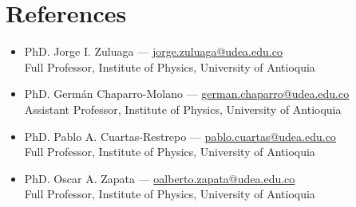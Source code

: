 \section*{References}
\begin{itemize}
    \item PhD. Jorge I. Zuluaga — \href{mailto:jorge.zuluaga@udea.edu.co}{\faEnvelope\hspace{6pt}jorge.zuluaga@udea.edu.co}\\
    Full Professor, Institute of Physics, University of Antioquia
    \item PhD. Germán Chaparro-Molano — \href{mailto:german.chaparro@udea.edu.co}{\faEnvelope\hspace{6pt}german.chaparro@udea.edu.co}\\
    Assistant Professor, Institute of Physics, University of Antioquia
    \item PhD. Pablo A. Cuartas-Restrepo — \href{mailto:pablo.cuartas@udea.edu.co}{\faEnvelope\hspace{6pt}pablo.cuartas@udea.edu.co}\\
    Full Professor, Institute of Physics, University of Antioquia
    \item PhD. Oscar A. Zapata — \href{mailto:oalberto.zapata@udea.edu.co}{\faEnvelope\hspace{6pt}oalberto.zapata@udea.edu.co}\\
    Full Professor, Institute of Physics, University of Antioquia
\end{itemize}
